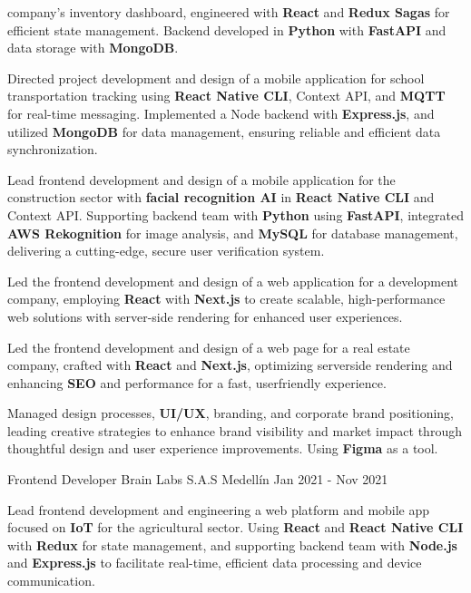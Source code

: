 \begin{cventries}
{\begin{cvitems}
{    company's inventory dashboard, engineered with \textbf{React} and
    \textbf{Redux Sagas} for efficient state management. Backend
    developed in \textbf{Python} with \textbf{FastAPI} and data storage with
    \textbf{MongoDB}.}
    \item {Directed project development and design of a mobile
    application for school transportation tracking using \textbf{React Native CLI}, 
    Context API, and \textbf{MQTT} for real-time messaging.
    Implemented a Node backend with \textbf{Express.js}, and utilized
    \textbf{MongoDB} for data management, ensuring reliable and
    efficient data synchronization.}
    \item {Lead frontend development and design of a mobile
    application for the construction sector with \textbf{facial recognition
    AI} in \textbf{React Native CLI} and Context API. Supporting backend
    team with \textbf{Python} using \textbf{FastAPI}, integrated \textbf{AWS Rekognition}
    for image analysis, and \textbf{MySQL} for database management,
    delivering a cutting-edge, secure user verification system.}
    \item {Led the frontend development and design of a web application for a
    development company, employing \textbf{React} with \textbf{Next.js} to create
    scalable, high-performance web solutions with server-side
    rendering for enhanced user experiences.}
    \item {Led the frontend development and design of a web page for a real
    estate company, crafted with \textbf{React} and \textbf{Next.js}, optimizing serverside rendering and enhancing \textbf{SEO} and performance for a fast, userfriendly experience.}
    \item {Managed design processes, \textbf{UI/UX}, branding, and corporate brand
    positioning, leading creative strategies to enhance brand visibility
    and market impact through thoughtful design and user experience
    improvements. Using \textbf{Figma} as a tool.}
  \end{cvitems}
}
\cventry
{Frontend Developer} %
{Brain Labs S.A.S} %
{Medellín} %
{Jan 2021 - Nov 2021} %
{
  \begin{cvitems}
    \item {Lead frontend development and engineering a web platform and
    mobile app focused on \textbf{IoT} for the agricultural sector. Using \textbf{React} and
    \textbf{React Native CLI} with \textbf{Redux} for state management, and supporting
    backend team with \textbf{Node.js} and \textbf{Express.js} to facilitate real-time,
    efficient data processing and device communication.}
  \end{cvitems}
}
\end{cventries}